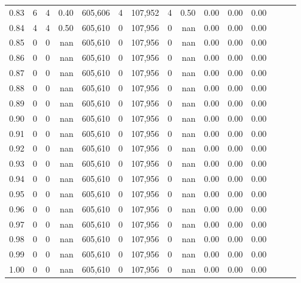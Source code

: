 \begin{tabular}{rrrrrrrrrrrrrrr}
0.83 &       6 &      4 &  0.40 &  605,606 &        4 &  107,952 &        4 &  0.50 &  0.00 &  0.00 &      0.00 \\
0.84 &       4 &      4 &  0.50 &  605,610 &        0 &  107,956 &        0 &   nan &  0.00 &  0.00 &      0.00 \\
0.85 &       0 &      0 &   nan &  605,610 &        0 &  107,956 &        0 &   nan &  0.00 &  0.00 &      0.00 \\
0.86 &       0 &      0 &   nan &  605,610 &        0 &  107,956 &        0 &   nan &  0.00 &  0.00 &      0.00 \\
0.87 &       0 &      0 &   nan &  605,610 &        0 &  107,956 &        0 &   nan &  0.00 &  0.00 &      0.00 \\
0.88 &       0 &      0 &   nan &  605,610 &        0 &  107,956 &        0 &   nan &  0.00 &  0.00 &      0.00 \\
0.89 &       0 &      0 &   nan &  605,610 &        0 &  107,956 &        0 &   nan &  0.00 &  0.00 &      0.00 \\
0.90 &       0 &      0 &   nan &  605,610 &        0 &  107,956 &        0 &   nan &  0.00 &  0.00 &      0.00 \\
0.91 &       0 &      0 &   nan &  605,610 &        0 &  107,956 &        0 &   nan &  0.00 &  0.00 &      0.00 \\
0.92 &       0 &      0 &   nan &  605,610 &        0 &  107,956 &        0 &   nan &  0.00 &  0.00 &      0.00 \\
0.93 &       0 &      0 &   nan &  605,610 &        0 &  107,956 &        0 &   nan &  0.00 &  0.00 &      0.00 \\
0.94 &       0 &      0 &   nan &  605,610 &        0 &  107,956 &        0 &   nan &  0.00 &  0.00 &      0.00 \\
0.95 &       0 &      0 &   nan &  605,610 &        0 &  107,956 &        0 &   nan &  0.00 &  0.00 &      0.00 \\
0.96 &       0 &      0 &   nan &  605,610 &        0 &  107,956 &        0 &   nan &  0.00 &  0.00 &      0.00 \\
0.97 &       0 &      0 &   nan &  605,610 &        0 &  107,956 &        0 &   nan &  0.00 &  0.00 &      0.00 \\
0.98 &       0 &      0 &   nan &  605,610 &        0 &  107,956 &        0 &   nan &  0.00 &  0.00 &      0.00 \\
0.99 &       0 &      0 &   nan &  605,610 &        0 &  107,956 &        0 &   nan &  0.00 &  0.00 &      0.00 \\
1.00 &       0 &      0 &   nan &  605,610 &        0 &  107,956 &        0 &   nan &  0.00 &  0.00 &      0.00 \\
\bottomrule
\end{tabular}
